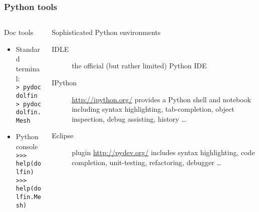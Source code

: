 \begin{frame}[shrink=10,t]
    \frametitle{Python tools}
    \begin{columns}[t]
        \begin{column}{0.45\textwidth}
            \begin{block}{Doc tools}
                \vspace{1em}
                \begin{itemize}
                    \item Standard terminal:
                        \\ \texttt{> pydoc dolfin}
                        \\ \texttt{> pydoc dolfin.Mesh}
                    \item Python console
                        \\ \texttt{>>> help(dolfin)}
                        \\ \texttt{>>> help(dolfin.Mesh)}
                \end{itemize}
            \end{block}
        \end{column}
        \begin{column}{0.60\textwidth}
    \begin{block}{Sophisticated Python environments}
        \begin{description}
            \item[IDLE] the official (but rather limited) Python IDE
            \item[IPython] \url{http://ipython.org/} provides a
                Python shell and notebook including syntax
                highlighting, tab-completion, object inspection,
                debug assisting, history \ldots
            \item[Eclipse] plugin \url{http://pydev.org/}
                includes syntax highlighting, code completion,
                unit-testing, refactoring, debugger \ldots
        \end{description}
    \end{block}
        \end{column}
    \end{columns}
\end{frame}
